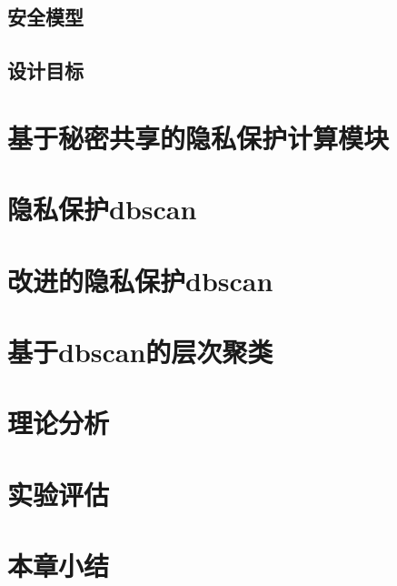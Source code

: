 \subsection{安全模型}

\subsection{设计目标}
\section{基于秘密共享的隐私保护计算模块}
\label{s4-subpro}
\section{隐私保护dbscan}
\label{s4-t1}
\section{改进的隐私保护dbscan}
\label{s4-t2}
\section{基于dbscan的层次聚类}
\label{s4-t3}
\section{理论分析}
\label{s4-lilun}
\section{实验评估}
\label{s4-shiyan}
\section{本章小结}
\label{s4-xiaojie}